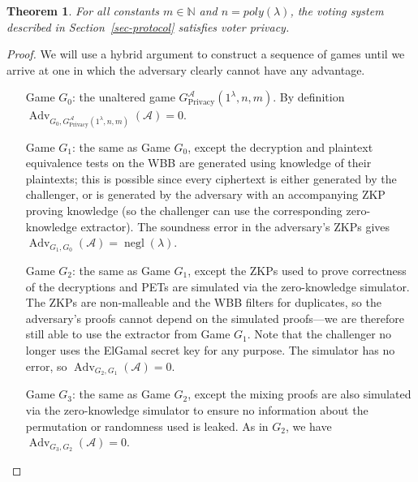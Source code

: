 \documentclass[12pt,a4paper]{article}
\DeclareMathOperator{\negl}{\text{negl}}
\DeclareMathOperator{\Adv}{\text{Adv}}
\newtheorem{theorem}{Theorem}
\theoremstyle{definition}
\newcounter{protocol}
\begin{document}
\begin{theorem}\label{thm-privacy}
    For all constants $m \in \mathbb{N}$ and $n=poly(\lambda)$, the voting system described in Section~\ref{sec-protocol} satisfies voter privacy.
\end{theorem}
\begin{proof}
    We will use a hybrid argument to construct a sequence of games until we arrive at one in which the adversary clearly cannot have any advantage.
    \begin{itemize}[leftmargin=4em]
        \item[Game] $G_0$: the unaltered game $G^\mathcal{A}_{\text{Privacy}}(1^\lambda, n, m)$. By definition $\Adv_{G_0, G^\mathcal{A}_{\text{Privacy}}(1^\lambda, n, m)}(\mathcal{A})=0$.
        
        \item[Game] $G_1$: the same as Game $G_0$, except the decryption and plaintext equivalence tests on the WBB are generated using knowledge of their plaintexts; this is possible since every ciphertext is either generated by the challenger, or is generated by the adversary with an accompanying ZKP proving knowledge (so the challenger can use the corresponding zero-knowledge extractor). The soundness error in the adversary's ZKPs gives $\Adv_{G_1, G_0}(\mathcal{A})=\negl(\lambda)$.
 
        \item[Game] $G_2$: the same as Game $G_1$, except the ZKPs used to prove correctness of the decryptions and PETs are simulated via the zero-knowledge simulator. The ZKPs are non-malleable and the WBB filters for duplicates, so the adversary's proofs cannot depend on the simulated proofs---we are therefore still able to use the extractor from Game $G_1$. Note that the challenger no longer uses the ElGamal secret key for any purpose. The simulator has no error, so $\Adv_{G_2, G_1}(\mathcal{A})=0$.
 
        \item[Game] $G_3$: the same as Game $G_2$, except the mixing proofs are also simulated via the zero-knowledge simulator to ensure no information about the permutation or randomness used is leaked. As in $G_2$, we have $\Adv_{G_3, G_2}(\mathcal{A})=0$.
        

\end{itemize}
\end{proof}
\end{document}
